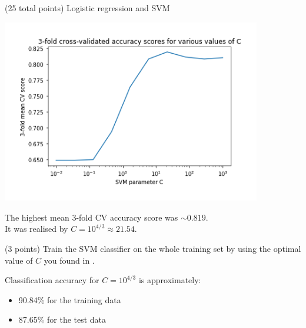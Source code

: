 \documentclass[12pt]{article}
\begin{document}
\begin{question}{(25 total points) Logistic regression and SVM}
\begin{subquestion}
   

      \begin{answerbox}{30em}
           \begin{center}
	\includegraphics[width=0.85\textwidth]{imgs/2_5.png}
	\end{center}
	The highest mean 3-fold CV accuracy score was $\sim 0.819$. \\
	It was realised by $C=10^{4/3} \approx 21.54$.
      \end{answerbox}
  


   \end{subquestion}
   \begin{subquestion}{(3 points)
       Train the SVM classifier on the whole training set by using the
       optimal value of $C$ you found in . 
     } \label{Q2.6}


       

      \begin{answerbox}{10em}
         Classification accuracy for $C=10^{4/3}$ is approximately:
         \begin{itemize}
        	\itemsep -3pt {}
        	\item 90.84\% for the training data
        	\item 87.65\% for the test data
         
		\end{itemize}          
      \end{answerbox}
  


   \end{subquestion}
%
%

\end{question}
\clearpage
%
%
\end{document}

